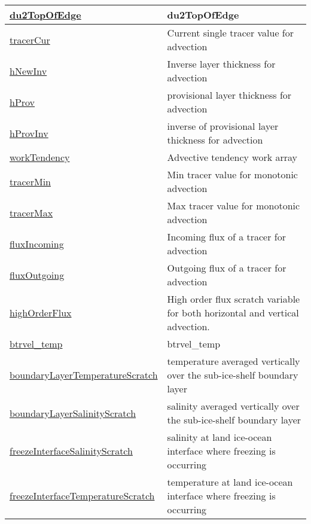 {\begin{center}
\begin{longtable}{| p{2.0in} | p{4.0in} |}
    \hline
    \hyperref[subsec:var_sec_scratch_du2TopOfEdge]{du2TopOfEdge} & du2TopOfEdge \\
    \hline
    \hyperref[subsec:var_sec_scratch_tracerCur]{tracerCur} & Current single tracer value for advection \\
    \hline
    \hyperref[subsec:var_sec_scratch_hNewInv]{hNewInv} & Inverse layer thickness for advection \\
    \hline
    \hyperref[subsec:var_sec_scratch_hProv]{hProv} & provisional layer thickness for advection \\
    \hline
    \hyperref[subsec:var_sec_scratch_hProvInv]{hProvInv} & inverse of provisional layer thickness for advection \\
    \hline
    \hyperref[subsec:var_sec_scratch_workTendency]{workTendency} & Advective tendency work array \\
    \hline
    \hyperref[subsec:var_sec_scratch_tracerMin]{tracerMin} & Min tracer value for monotonic advection \\
    \hline
    \hyperref[subsec:var_sec_scratch_tracerMax]{tracerMax} & Max tracer value for monotonic advection \\
    \hline
    \hyperref[subsec:var_sec_scratch_fluxIncoming]{fluxIncoming} & Incoming flux of a tracer for advection \\
    \hline
    \hyperref[subsec:var_sec_scratch_fluxOutgoing]{fluxOutgoing} & Outgoing flux of a tracer for advection \\
    \hline
    \hyperref[subsec:var_sec_scratch_highOrderFlux]{highOrderFlux} & High order flux scratch variable for both horizontal and vertical advection. \\
    \hline
    \hyperref[subsec:var_sec_scratch_btrvel_temp]{btrvel\_temp} & btrvel\_temp \\
    \hline
    \hyperref[subsec:var_sec_scratch_boundaryLayerTemperatureScratch]{boundaryLayerTemperature\-Scratch} & temperature averaged vertically over the sub-ice-shelf boundary layer \\
    \hline
    \hyperref[subsec:var_sec_scratch_boundaryLayerSalinityScratch]{boundaryLayerSalinityScratch} & salinity averaged vertically over the sub-ice-shelf boundary layer \\
    \hline
    \hyperref[subsec:var_sec_scratch_freezeInterfaceSalinityScratch]{freezeInterfaceSalinityScratch} & salinity at land ice-ocean interface where freezing is occurring \\
    \hline
    \hyperref[subsec:var_sec_scratch_freezeInterfaceTemperatureScratch]{freezeInterfaceTemperatureScratch} & temperature at land ice-ocean interface where freezing is occurring \\

\end{longtable}
\end{center}}
